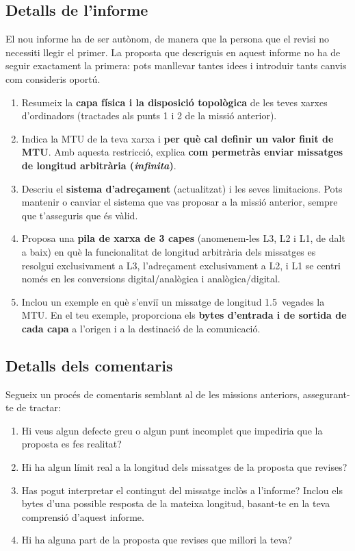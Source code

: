 \subsection*{Detalls de l'informe}
El nou informe ha de ser autònom, de manera que la persona que el revisi no necessiti llegir el primer.
La proposta que descriguis en aquest informe no ha de seguir exactament la primera: pots manllevar tantes idees i introduir tants canvis com consideris oportú.
%
\begin{enumerate}[itemsep=0.1cm]
\item Resumeix la \textbf{capa física i la disposició topològica} de les teves xarxes d'ordinadors (tractades als punts 1 i 2 de la missió anterior).

\item Indica la MTU de la teva xarxa i \textbf{per què cal definir un valor finit de MTU}. Amb aquesta restricció, explica \textbf{com permetràs enviar missatges de longitud arbitrària (\textit{infinita})}.

\item Descriu el \textbf{sistema d'adreçament} (actualitzat) i les seves limitacions. Pots mantenir o canviar el sistema que vas proposar a la missió anterior, sempre que t'asseguris que és vàlid.

\item Proposa una \textbf{pila de xarxa de 3 capes} (anomenem-les L3, L2 i L1, de dalt a baix) en què la funcionalitat de longitud arbitrària dels missatges es resolgui exclusivament a L3, l'adreçament exclusivament a L2, i L1 se centri només en les conversions digital/analògica i analògica/digital.

\item Inclou un exemple en què s'enviï un missatge de longitud 1.5~vegades la MTU. En el teu exemple, proporciona els \textbf{bytes d'entrada i de sortida de cada capa} a l'origen i a la destinació de la comunicació.
\end{enumerate}

\subsection*{Detalls dels comentaris}

Segueix un procés de comentaris semblant al de les missions anteriors, assegurant-te de tractar:
\begin{enumerate}[itemsep=0.1cm]
\item Hi veus algun defecte greu o algun punt incomplet que impediria que la proposta es fes realitat?
\item Hi ha algun límit real a la longitud dels missatges de la proposta que revises?
\item Has pogut interpretar el contingut del missatge inclòs a l'informe? Inclou els bytes d'una possible resposta de la mateixa longitud, basant-te en la teva comprensió d'aquest informe.
\item Hi ha alguna part de la proposta que revises que millori la teva?
\end{enumerate}

